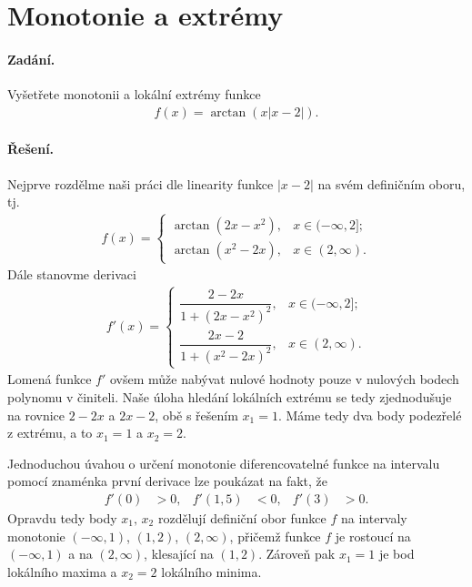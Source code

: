 \documentclass[a4paper,11pt]{article}
\begin{document}
	
	\section{Monotonie a extrémy}
	
	\paragraph*{Zadání.} Vyšetřete monotonii a lokální extrémy funkce
	\begin{align*}
		f(x) = \arctan(x|x-2|).
	\end{align*}
	
	\paragraph*{Řešení.} Nejprve rozdělme naši práci dle linearity funkce $|x-2|$ na svém definičním oboru, tj.
	\begin{align*}
		f(x) = \begin{cases}
			\arctan(2x-x^2), & x \in (-\infty,2];
		\\
			\arctan(x^2-2x), & x \in (2,\infty).
		\end{cases}
	\end{align*}
	Dále stanovme derivaci
	\begin{align*}
		f'(x) = \begin{cases}
			\dfrac{2-2x}{1+(2x-x^2)^2}, & x \in (-\infty,2];
		\\[3mm]
			\dfrac{2x-2}{1+(x^2-2x)^2}, & x \in (2,\infty).
		\end{cases}
	\end{align*}
	Lomená funkce $f'$ ovšem může nabývat nulové hodnoty pouze v nulových bodech polynomu v činiteli. Naše úloha hledání lokálních extrému se tedy zjednodušuje na rovnice $2-2x$ a $2x-2$, obě s řešením $x_1=1$. Máme tedy dva body podezřelé z extrému, a to $x_1 = 1$ a $x_2 = 2$.
	
	Jednoduchou úvahou o určení monotonie diferencovatelné funkce na intervalu pomocí znaménka první derivace lze poukázat na fakt, že
	\begin{align*}
		f'(0) &> 0,
	&
		f'(1,5) &< 0,
	&
		f'(3) &> 0.
	\end{align*}
	Opravdu tedy body $x_1, \, x_2$ rozdělují definiční obor funkce $f$ na intervaly monotonie $(-\infty, 1)$, $(1,2)$, $(2,\infty)$, přičemž funkce $f$ je rostoucí na $(-\infty, 1)$ a na $(2,\infty)$, klesající na $(1,2)$. Zároveň pak $x_1 = 1$ je bod lokálního maxima a $x_2 = 2$ lokálního minima.
	
\end{document}
